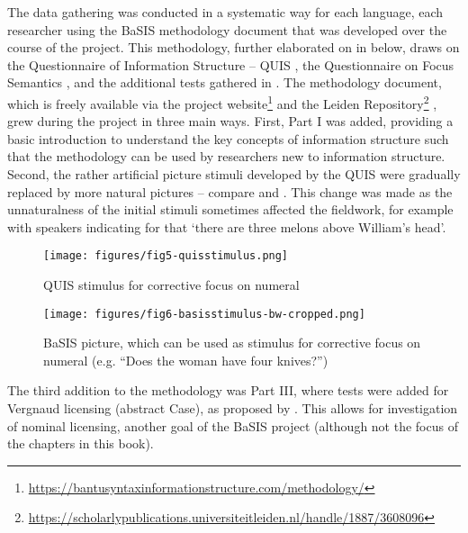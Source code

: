 \documentclass[output=paper]{langscibook}
\begin{document}
The data gathering was conducted in a systematic way for each language, each researcher using the BaSIS methodology document that was developed over the course of the project. This methodology, further elaborated on in  below, draws on the Questionnaire of Information Structure – QUIS \citep{SkopeteasEtAl2006}, the Questionnaire on Focus Semantics \citep{RenansEtAl2010}, and the additional tests gathered in \citet{vanderWal2016}. The methodology document, which is freely available via the project website\footnote{\url{https://bantusyntaxinformationstructure.com/methodology/}} and the Leiden Repository\footnote{\url{https://scholarlypublications.universiteitleiden.nl/handle/1887/3608096}} \citep{vanderWal2021}, grew during the project in three main ways. First, Part I was added, providing a basic introduction to understand the key concepts of information structure such that the methodology can be used by researchers new to information structure. Second, the rather artificial picture stimuli developed by the QUIS were gradually replaced by more natural pictures – compare  and . This change was made as the unnaturalness of the initial stimuli sometimes affected the fieldwork, for example with speakers indicating for  that ‘there are three melons above William’s head’.

  
\begin{figure}
\texttt{[image: figures/fig5-quisstimulus.png]}
\caption{QUIS stimulus for corrective focus on numeral}
\label{fig:quisstimulus}
\end{figure}

  
\begin{figure}
\texttt{[image: figures/fig6-basisstimulus-bw-cropped.png]}
\caption{BaSIS picture, which can be used as stimulus for corrective focus on numeral (e.g. “Does the woman have four knives?”)}
\label{fig:basisstimulus}
\end{figure}

The third addition to the methodology was Part III, where tests were added for Vergnaud licensing (abstract Case), as proposed by \citet{SheehanvanderWal2018}. This allows for investigation of nominal licensing, another goal of the BaSIS project (although not the focus of the chapters in this book). 
\end{document}
